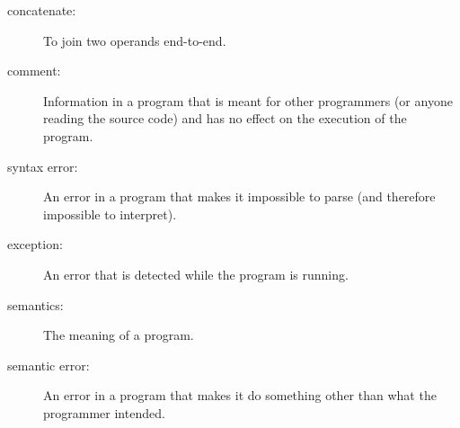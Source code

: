 \begin{description}
\item[concatenate:]  To join two operands end-to-end.

\item[comment:]  Information in a program that is meant for other
programmers (or anyone reading the source code) and has no effect on the
execution of the program.

\item[syntax error:]  An error in a program that makes it impossible
to parse (and therefore impossible to interpret).

\item[exception:]  An error that is detected while the program is running.

\item[semantics:]  The meaning of a program.

\item[semantic error:]   An error in a program that makes it do something
other than what the programmer intended.

\end{description}

